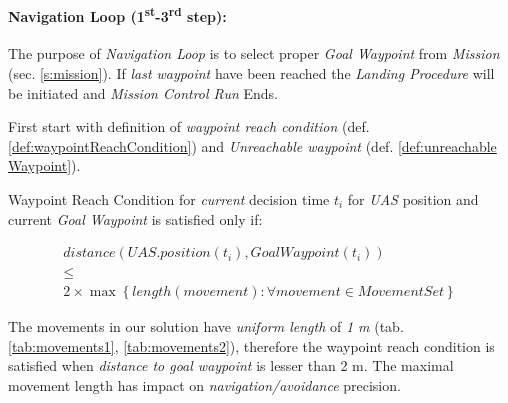 \paragraph{Navigation Loop (1\textsuperscript{st}-3\textsuperscript{rd} step):} The purpose of \emph{Navigation Loop} is to select proper \emph{Goal Waypoint} from \emph{Mission} (sec. \ref{s:mission}). If \emph{last waypoint} have been reached the \emph{Landing Procedure} will be initiated and \emph{Mission Control Run} Ends.

First start with definition of \emph{waypoint reach condition} (def. \ref{def:waypointReachCondition}) and \emph{Unreachable waypoint} (def. \ref{def:unreachable Waypoint}).

\begin{definition}{Waypoint Reach Condition}\label{def:waypointReachCondition} for \emph{current} decision time $t_i$ for \emph{UAS} position and current \emph{Goal Waypoint} is satisfied only if:

\begin{multline}\label{eq:waypointReachCondition}
    distance(UAS.position(t_i),GoalWaypoint(t_i)) \\\le \\2 \times \max \left\{length(movement):\forall movement\in MovementSet\right\}
\end{multline}

    \begin{note}
        The movements in our solution have \emph{uniform length} of \emph{1 m} (tab. \ref{tab:movements1}, \ref{tab:movements2}), therefore the waypoint reach condition is satisfied when \emph{distance to goal waypoint} is lesser than 2 m. The maximal movement length has impact on \emph{navigation/avoidance} precision.
    \end{note}
\end{definition}

